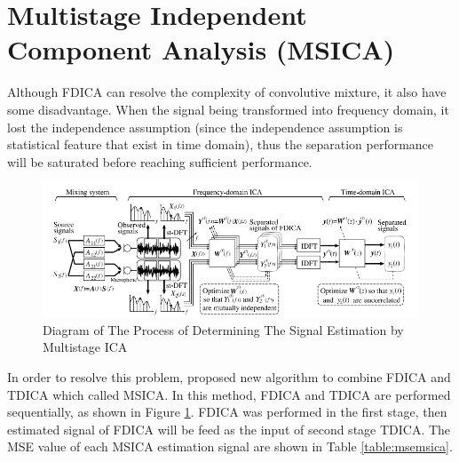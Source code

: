 \documentclass[a4paper]{jpconf}
\begin{document}
\section{Multistage Independent Component Analysis (MSICA)}
Although FDICA can resolve the complexity of convolutive mixture, it also have some disadvantage. When the signal being transformed into frequency domain, it lost the independence assumption (since the independence assumption is statistical feature that exist in time domain), thus the separation performance will be saturated before reaching sufficient performance. 

\begin{figure}[ht]
\begin{center}
\includegraphics[width=5.5in]{msica.png}
\end{center}
\caption{\label{pict:msica}Diagram of The Process of Determining The Signal Estimation by Multistage ICA}
\end{figure}

In order to resolve this problem, \cite{2} proposed new algorithm to combine FDICA and TDICA which called MSICA. In this method, FDICA and TDICA are performed sequentially, as shown in Figure \ref{pict:msica}. FDICA was performed in the first stage, then estimated signal of FDICA will be feed as the input of second stage TDICA. The MSE value of each MSICA estimation signal are shown in Table \ref{table:msemsica}.
\end{document}
